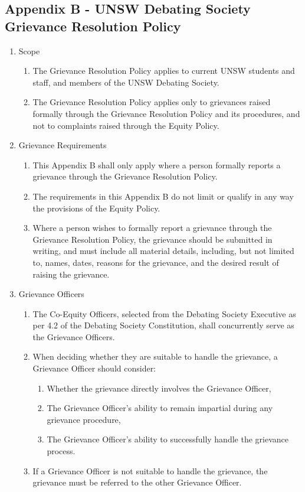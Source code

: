 \newpage
\renewcommand\thesubsection{}
\subsection{Appendix B - UNSW Debating Society Grievance Resolution Policy}
\renewcommand\thesubsection{\Alph{subsection}}

\begin{enumerate}
\item Scope
  \begin{enumerate}
  \item The Grievance Resolution Policy applies to current UNSW students and staff, and members of the UNSW Debating Society.
  \item The Grievance Resolution Policy applies only to grievances raised formally through the Grievance Resolution Policy and its procedures, and not to complaints raised through the Equity Policy.
  \end{enumerate}

\item Grievance Requirements
  \begin{enumerate}
  \item This Appendix B shall only apply where a person formally reports a grievance through the Grievance Resolution Policy.
  \item The requirements in this Appendix B do not limit or qualify in any way the provisions of the Equity Policy.
  \item Where a person wishes to formally report a grievance through the Grievance Resolution Policy, the grievance should be submitted in writing, and must include all material details, including, but not limited to, names, dates, reasons for the grievance, and the desired result of raising the grievance.
  \end{enumerate}

\item Grievance Officers
  \begin{enumerate}
  \item The Co-Equity Officers, selected from the Debating Society Executive as per 4.2 of the Debating Society Constitution, shall concurrently serve as the Grievance Officers.
  \item When deciding whether they are suitable to handle the grievance, a Grievance Officer should consider:
    \begin{enumerate}
    \item Whether the grievance directly involves the Grievance Officer,
    \item The Grievance Officer’s ability to remain impartial during any grievance procedure,
    \item The Grievance Officer’s ability to successfully handle the grievance process.
    \end{enumerate}
  \item If a Grievance Officer is not suitable to handle the grievance, the grievance must be referred to the other Grievance Officer.
  \end{enumerate}


\end{enumerate}
